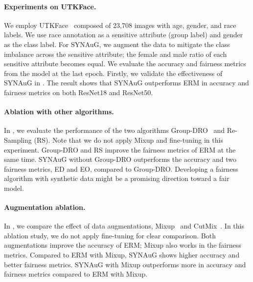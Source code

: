 
\paragraph{Experiments on UTKFace.}
We employ UTKFace~\cite{zhifei2017cvpr} composed of 23,708 images with age, gender, and race labels.
We use race annotation as a sensitive attribute (group label) and gender as the class label.
For SYNAuG, we augment the data to mitigate the class imbalance across the sensitive attribute;
the female and male ratio of each sensitive attribute becomes equal.
We evaluate the accuracy and fairness metrics from the model at the last epoch.
Firstly, we validate the effectiveness of SYNAuG in .
The result shows that SYNAuG outperforms ERM in accuracy and fairness metrics on both ResNet18 and ResNet50.

\paragraph{Ablation with other algorithms.} 
In , we evaluate the performance of the two algorithms Group-DRO~\cite{sagawa2019distributionally} and Re-Sampling (RS).
Note that we do not apply Mixup and fine-tuning in this experiment.
Group-DRO and RS improve the fairness metrics of ERM at the same time.
SYNAuG without Group-DRO outperforms the accuracy and two fairness metrics, ED and EO, compared to Group-DRO.
Developing a fairness algorithm with synthetic data might be a promising direction toward a fair model.

\paragraph{Augmentation ablation.} 
In , we compare the effect of data augmentations, Mixup~\cite{zhang2017mixup} and CutMix~\cite{yun2019cutmix}.
In this ablation study, we do not apply fine-tuning for clear comparison.
Both augmentations improve the accuracy of ERM; Mixup also works 
in the fairness metrics.
Compared to ERM with Mixup, SYNAuG shows higher accuracy and better fairness metrics.
SYNAuG with Mixup outperforms more in accuracy and fairness metrics compared to ERM with Mixup.


